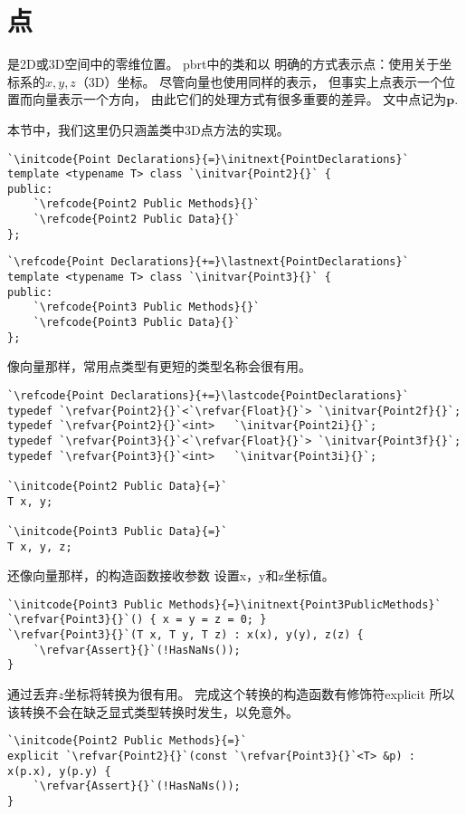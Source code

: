\section{点}\label{sec:点}

是2D或3D空间中的零维位置。
pbrt中的类和以
明确的方式表示点：使用关于坐标系的$x,y,z$（3D）坐标。
尽管向量也使用同样的表示，
但事实上点表示一个位置而向量表示一个方向，
由此它们的处理方式有很多重要的差异。
文中点记为$\bm p$.

本节中，我们这里仍只涵盖类中3D点方法的实现。
\begin{lstlisting}
`\initcode{Point Declarations}{=}\initnext{PointDeclarations}`
template <typename T> class `\initvar{Point2}{}` {
public:
    `\refcode{Point2 Public Methods}{}`
    `\refcode{Point2 Public Data}{}`
};
\end{lstlisting}

\begin{lstlisting}
`\refcode{Point Declarations}{+=}\lastnext{PointDeclarations}`
template <typename T> class `\initvar{Point3}{}` {
public:
    `\refcode{Point3 Public Methods}{}`
    `\refcode{Point3 Public Data}{}`
};
\end{lstlisting}

像向量那样，常用点类型有更短的类型名称会很有用。
\begin{lstlisting}
`\refcode{Point Declarations}{+=}\lastcode{PointDeclarations}`
typedef `\refvar{Point2}{}`<`\refvar{Float}{}`> `\initvar{Point2f}{}`;
typedef `\refvar{Point2}{}`<int>   `\initvar{Point2i}{}`;
typedef `\refvar{Point3}{}`<`\refvar{Float}{}`> `\initvar{Point3f}{}`;
typedef `\refvar{Point3}{}`<int>   `\initvar{Point3i}{}`;

`\initcode{Point2 Public Data}{=}`
T x, y;

`\initcode{Point3 Public Data}{=}`
T x, y, z;
\end{lstlisting}

还像向量那样，的构造函数接收参数
设置{\ttfamily x}，{\ttfamily y}和{\ttfamily z}坐标值。
\begin{lstlisting}
`\initcode{Point3 Public Methods}{=}\initnext{Point3PublicMethods}`
`\refvar{Point3}{}`() { x = y = z = 0; }
`\refvar{Point3}{}`(T x, T y, T z) : x(x), y(y), z(z) {
    `\refvar{Assert}{}`(!HasNaNs());
}
\end{lstlisting}

通过丢弃$z$坐标将转换为很有用。
完成这个转换的构造函数有修饰符{\ttfamily explicit}
所以该转换不会在缺乏显式类型转换时发生，以免意外。
\begin{lstlisting}
`\initcode{Point2 Public Methods}{=}`
explicit `\refvar{Point2}{}`(const `\refvar{Point3}{}`<T> &p) : x(p.x), y(p.y) {
    `\refvar{Assert}{}`(!HasNaNs());
}
\end{lstlisting}

